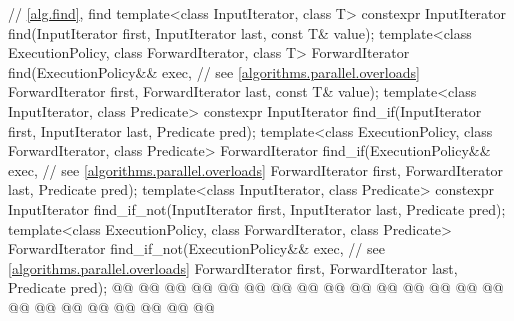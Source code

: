 \begin{codeblock}
{  // \ref{alg.find}, find
  template<class InputIterator, class T>
    constexpr InputIterator find(InputIterator first, InputIterator last,
                                 const T& value);
  template<class ExecutionPolicy, class ForwardIterator, class T>
    ForwardIterator find(ExecutionPolicy&& exec, // see \ref{algorithms.parallel.overloads}
                         ForwardIterator first, ForwardIterator last,
                         const T& value);
  template<class InputIterator, class Predicate>
    constexpr InputIterator find_if(InputIterator first, InputIterator last,
                                    Predicate pred);
  template<class ExecutionPolicy, class ForwardIterator, class Predicate>
    ForwardIterator find_if(ExecutionPolicy&& exec, // see \ref{algorithms.parallel.overloads}
                            ForwardIterator first, ForwardIterator last,
                            Predicate pred);
  template<class InputIterator, class Predicate>
    constexpr InputIterator find_if_not(InputIterator first, InputIterator last,
                                        Predicate pred);
  template<class ExecutionPolicy, class ForwardIterator, class Predicate>
    ForwardIterator find_if_not(ExecutionPolicy&& exec, // see \ref{algorithms.parallel.overloads}
                                ForwardIterator first, ForwardIterator last,
                                Predicate pred);
  @@
    @@
      @@
      @@
    @@
      @@
      @@
        @@
    @@
        @@
      @@
    @@
        @@
      @@
        @@
    @@
        @@
      @@
    @@
        @@
      @@
        @@
  @\added{\}}@

}
\end{codeblock}

